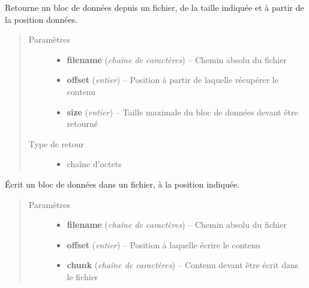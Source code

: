\documentclass[letterpaper,10pt,english]{sphinxmanual}
\begin{document}
\begin{fulllineitems}
\label{drivers:get_chunk}
Retourne un bloc de données depuis un fichier, de la taille indiquée et à partir de la position données.
\begin{quote}\begin{description}
\item[{Paramètres}] \leavevmode\begin{itemize}
\item {} 
\textbf{filename} (\emph{chaîne de caractères}) -- Chemin absolu du fichier

\item {} 
\textbf{offset} (\emph{entier}) -- Position à partir de laquelle récupérer le contenu

\item {} 
\textbf{size} (\emph{entier}) -- Taille maximale du bloc de données devant être retourné

\end{itemize}

\item[{Type de retour}] \leavevmode\begin{itemize}
\item {} 
chaîne d'octets

\end{itemize}

\end{description}\end{quote}

\end{fulllineitems}


\begin{fulllineitems}
\label{drivers:upload_chunk}
Écrit un bloc de données dans un fichier, à la position indiquée.
\begin{quote}\begin{description}
\item[{Paramètres}] \leavevmode\begin{itemize}
\item {} 
\textbf{filename} (\emph{chaîne de caractères}) -- Chemin absolu du fichier

\item {} 
\textbf{offset} (\emph{entier}) -- Position à laquelle écrire le contenu

\item {} 
\textbf{chunk} (\emph{chaîne de caractères}) -- Contenu devant être écrit dans le fichier

\end{itemize}

\end{description}\end{quote}

\end{fulllineitems}
\end{document}
